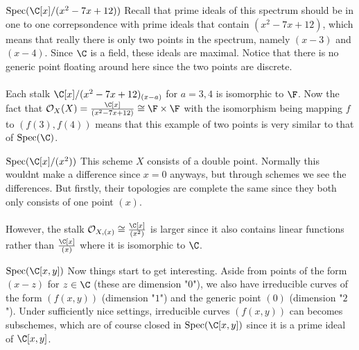 \documentclass[a4paper]{article}
\begin{document}
\begin{eg}{$\text{Spec}(\C[x]/(x^2-7x+12))$}{} Recall that prime ideals of this spectrum should be in one to one correpsondence with prime ideals that contain $(x^2-7x+12)$, which means that really there is only two points in the spectrum, namely $(x-3)$ and $(x-4)$. Since $\C$ is a field, these ideals are maximal. Notice that there is no generic point floating around here since the two points are discrete. \\~\\
Each stalk $\C[x]/(x^2-7x+12)_{(x-a)}$ for $a=3,4$ is isomorphic to $\F$. Now the fact that $\mathcal{O}_X(X)=\frac{\C[x]}{(x^2-7x+12)}\cong\F\times\F$ with the isomorphism being mapping $f$ to $(f(3),f(4))$ means that this example of two points is very similar to that of $\text{Spec}(\C)$. 
\end{eg}

\begin{eg}{$\text{Spec}(\C[x]/(x^2))$}{} This scheme $X$ consists of a double point. Normally this wouldnt make a difference since $x=0$ anyways, but through schemes we see the differences. But firstly, their topologies are complete the same since they both only consists of one point $(x)$. \\~\\
However, the stalk $\mathcal{O}_{X,(x)}\cong\frac{\C[x]}{(x^2)}$ is larger since it also contains linear functions rather than $\frac{\C[x]}{(x)}$ where it is isomorphic to $\C$. 
\end{eg}

\begin{eg}{$\text{Spec}(\C[x,y])$}{} Now things start to get interesting. Aside from points of the form $(x-z)$ for $z\in\C$ (these are dimension "$0$"), we also have irreducible curves of the form $(f(x,y))$ (dimension "$1$") and the generic point $(0)$ (dimension "$2$"). Under sufficiently nice settings, irreducible curves $(f(x,y))$ can becomes subschemes, which are of course closed in $\text{Spec}(\C[x,y])$ since it is a prime ideal of $\C[x,y]$. 
\end{eg}
\end{document}

